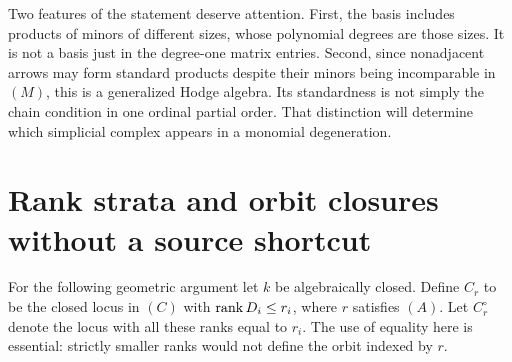 Two features of the statement deserve attention.
First, the basis includes products of minors
of different sizes, whose polynomial degrees
are those sizes.  It is not a basis just in
the degree-one matrix entries.  Second, since
nonadjacent arrows may form standard products
despite their minors being incomparable in
\((M)\), this is a generalized Hodge algebra.
Its standardness is not simply the chain
condition in one ordinal partial order.
That distinction will determine which
simplicial complex appears in a monomial
degeneration.

\section{Rank strata and orbit closures without a source shortcut}

For the following geometric argument let \(k\) be
algebraically closed.  Define \(C_r\) to be the
closed locus in \((C)\) with
\(\operatorname{rank} D_i\le r_i\), where \(r\) satisfies
\((A)\).  Let \(C_r^\circ\) denote the locus
with all these ranks equal to \(r_i\).
The use of equality here is essential:
strictly smaller ranks would not define
the orbit indexed by \(r\).

